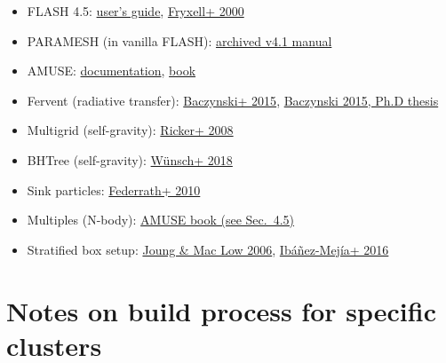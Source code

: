 \documentclass[10pt]{article}
\begin{document}
\begin{itemize}
    \item FLASH 4.5:
        \href{http://flash.uchicago.edu/site/flashcode/user_support/}{user's guide},
        \href{http://adsabs.harvard.edu/abs/2000ApJS..131..273F}{Fryxell+ 2000}
    \item PARAMESH (in vanilla FLASH):
        \href{https://web.archive.org/web/20160421055017/http://www.physics.drexel.edu/~olson/paramesh-doc/Users_manual/amr.html}{archived v4.1 manual}
    \item AMUSE:
        \href{http://www.amusecode.org/}{documentation},
        \href{https://iopscience.iop.org/book/978-0-7503-1320-9}{book}
    \item Fervent (radiative transfer):
        \href{https://ui.adsabs.harvard.edu/abs/2015MNRAS.454..380B/abstract}{Baczynski+ 2015},
        \href{http://archiv.ub.uni-heidelberg.de/volltextserver/19189/}{Baczynski 2015, Ph.D thesis}
    \item Multigrid (self-gravity):
        \href{https://ui.adsabs.harvard.edu/abs/2008ApJS..176..293R/abstract}{Ricker+ 2008}
    \item BHTree (self-gravity):
        \href{https://ui.adsabs.harvard.edu/abs/2018MNRAS.475.3393W/abstract}{W\"{u}nsch+ 2018}
    \item Sink particles:
        \href{https://ui.adsabs.harvard.edu/abs/2010ApJ...713..269F/abstract}{Federrath+ 2010}
    \item Multiples (N-body):
        \href{https://iopscience.iop.org/book/978-0-7503-1320-9}{AMUSE book (see Sec.~4.5)}
    \item Stratified box setup:
        \href{https://ui.adsabs.harvard.edu/abs/2006ApJ...653.1266J/abstract}{Joung \& Mac Low 2006},
        \href{https://ui.adsabs.harvard.edu/abs/2016ApJ...824...41I/abstract}{Ib\'{a}\~{n}ez-Mej\'{i}a+ 2016}
\end{itemize}

\section{Notes on build process for specific clusters}
\end{document}
